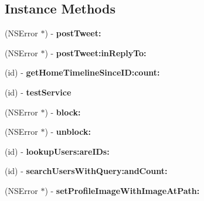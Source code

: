 \subsection*{Instance Methods}
\begin{DoxyCompactItemize}
\item 
\mbox{\label{interfaceFHSTwitterEngine_a0b9130228c96a7a5ae144ab6dbfa73c5}} 
(N\+S\+Error $\ast$) -\/ {\bfseries post\+Tweet\+:}
\item 
\mbox{\label{interfaceFHSTwitterEngine_a843d48bab70522ced857efe2d9d97f84}} 
(N\+S\+Error $\ast$) -\/ {\bfseries post\+Tweet\+:in\+Reply\+To\+:}
\item 
\mbox{\label{interfaceFHSTwitterEngine_ad88467828776f15334542c0219d253c8}} 
(id) -\/ {\bfseries get\+Home\+Timeline\+Since\+I\+D\+:count\+:}
\item 
\mbox{\label{interfaceFHSTwitterEngine_ae9b9d46839b32674672535eeddefd97d}} 
(id) -\/ {\bfseries test\+Service}
\item 
\mbox{\label{interfaceFHSTwitterEngine_ab2a10ccdf93f78317a7f9b0c2fe547aa}} 
(N\+S\+Error $\ast$) -\/ {\bfseries block\+:}
\item 
\mbox{\label{interfaceFHSTwitterEngine_ac1619611d3be86800dd55c306653f22d}} 
(N\+S\+Error $\ast$) -\/ {\bfseries unblock\+:}
\item 
\mbox{\label{interfaceFHSTwitterEngine_abab9eb01430e77bada2518b731034b0d}} 
(id) -\/ {\bfseries lookup\+Users\+:are\+I\+Ds\+:}
\item 
\mbox{\label{interfaceFHSTwitterEngine_a1108094b4ab3ed6faf18f734dc9e3130}} 
(id) -\/ {\bfseries search\+Users\+With\+Query\+:and\+Count\+:}
\item 
\mbox{\label{interfaceFHSTwitterEngine_aae843106a1cac749e21a66e9e4596308}} 
(N\+S\+Error $\ast$) -\/ {\bfseries set\+Profile\+Image\+With\+Image\+At\+Path\+:}
\item 
\mbox{\label{interfaceFHSTwitterEngine_a95acd9b5cad0e6bf4d7dc845935387dc}} 

\end{DoxyCompactItemize}
